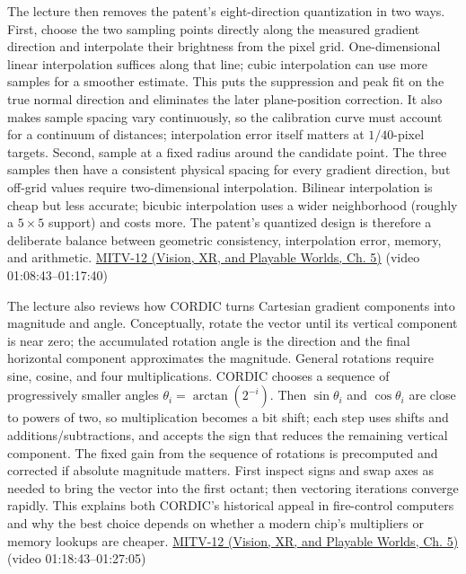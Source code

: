 The lecture then removes the patent's eight-direction quantization in two ways. First, choose the two sampling points directly along the measured gradient direction and interpolate their brightness from the pixel grid. One-dimensional linear interpolation suffices along that line; cubic interpolation can use more samples for a smoother estimate. This puts the suppression and peak fit on the true normal direction and eliminates the later plane-position correction. It also makes sample spacing vary continuously, so the calibration curve must account for a continuum of distances; interpolation error itself matters at \(1/40\)-pixel targets. Second, sample at a fixed radius around the candidate point. The three samples then have a consistent physical spacing for every gradient direction, but off-grid values require two-dimensional interpolation. Bilinear interpolation is cheap but less accurate; bicubic interpolation uses a wider neighborhood (roughly a \(5\times5\) support) and costs more. The patent's quantized design is therefore a deliberate balance between geometric consistency, interpolation error, memory, and arithmetic. \href{../07-Vision-XR-and-Playable-Worlds/main.pdf\#nameddest=04-visual-computing-ii-ch036-mitv-12---blob-analysis-binary-image-processing-greens-theorem-derivative-and-integral}{MITV-12 (Vision, XR, and Playable Worlds, Ch. 5)} (video 01:08:43--01:17:40)

The lecture also reviews how CORDIC turns Cartesian gradient components into magnitude and angle. Conceptually, rotate the vector until its vertical component is near zero; the accumulated rotation angle is the direction and the final horizontal component approximates the magnitude. General rotations require sine, cosine, and four multiplications. CORDIC chooses a sequence of progressively smaller angles \(\theta_i=\arctan(2^{-i})\). Then \(\sin\theta_i\) and \(\cos\theta_i\) are close to powers of two, so multiplication becomes a bit shift; each step uses shifts and additions/subtractions, and accepts the sign that reduces the remaining vertical component. The fixed gain from the sequence of rotations is precomputed and corrected if absolute magnitude matters. First inspect signs and swap axes as needed to bring the vector into the first octant; then vectoring iterations converge rapidly. This explains both CORDIC's historical appeal in fire-control computers and why the best choice depends on whether a modern chip's multipliers or memory lookups are cheaper. \href{../07-Vision-XR-and-Playable-Worlds/main.pdf\#nameddest=04-visual-computing-ii-ch036-mitv-12---blob-analysis-binary-image-processing-greens-theorem-derivative-and-integral}{MITV-12 (Vision, XR, and Playable Worlds, Ch. 5)} (video 01:18:43--01:27:05)


